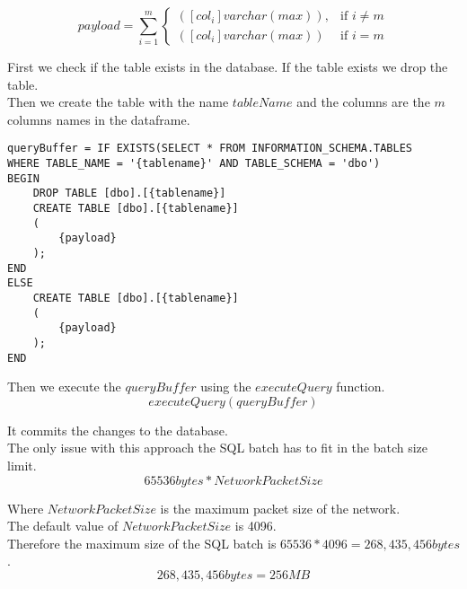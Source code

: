 \begin{equation}
payload = \sum_{i=1}^{m} 
\begin{cases}
    ([col_{i}] varchar(max)), & \text{if } i \neq m \\
    ([col_{i}] varchar(max)) & \text{if } i = m    
\end{cases}
\end{equation}

First we check if the table exists in the database. If the table exists we drop the table. \\

Then we create the table with the name $tableName$ and the columns are the $m$ columns names in the dataframe. \\

\begin{verbatim} 
queryBuffer = IF EXISTS(SELECT * FROM INFORMATION_SCHEMA.TABLES 
WHERE TABLE_NAME = '{tablename}' AND TABLE_SCHEMA = 'dbo')
BEGIN
    DROP TABLE [dbo].[{tablename}]
    CREATE TABLE [dbo].[{tablename}]
    (
        {payload}
    );
END
ELSE
    CREATE TABLE [dbo].[{tablename}]
    (
        {payload}
    );
END
\end{verbatim}

Then we execute the $queryBuffer$ using the $executeQuery$ function. \\
\begin{equation}
    executeQuery(queryBuffer)
\end{equation}

It commits the changes to the database. \\

The only issue with this approach the SQL batch has to fit in the batch size limit. \\
\begin{equation}
    65536 bytes * NetworkPacketSize
\end{equation}

Where $NetworkPacketSize$ is the maximum packet size of the network. \\

The default value of $NetworkPacketSize$ is 4096. \\

Therefore the maximum size of the SQL batch is $65536 * 4096 = 268,435,456 bytes$. \\
\begin{equation}
    268,435,456 bytes = 256 MB
\end{equation}

